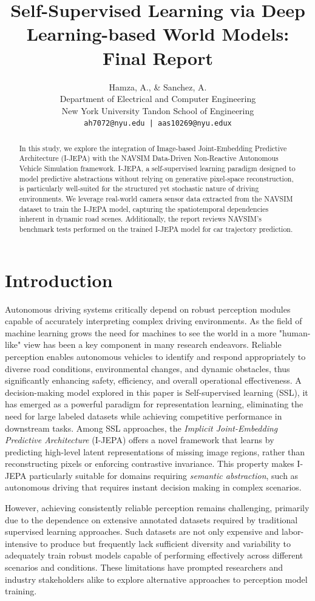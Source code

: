 \documentclass{article}
\title{Self-Supervised Learning via Deep Learning-based World Models: Final Report}
\author{
    Hamza, A., \& Sanchez, A. \\
    Department of Electrical and Computer Engineering \\
    New York University Tandon School of Engineering \\
    \texttt{ah7072@nyu.edu | aas10269@nyu.edux}
}
\begin{document}
\maketitle

\begin{abstract}
 In this study, we explore the integration of Image-based Joint-Embedding Predictive Architecture (I-JEPA) with the NAVSIM Data-Driven Non-Reactive Autonomous Vehicle Simulation framework. I-JEPA, a self-supervised learning paradigm designed to model predictive abstractions without relying on generative pixel-space reconstruction, is particularly well-suited for the structured yet stochastic nature of driving environments. We leverage real-world camera sensor data extracted from the NAVSIM dataset to train the I-JEPA model, capturing the spatiotemporal dependencies inherent in dynamic road scenes. Additionally, the report reviews NAVSIM's benchmark tests performed on the trained I-JEPA model for car trajectory prediction. 
\end{abstract}

\section{Introduction}
Autonomous driving systems critically depend on robust perception modules capable of accurately interpreting complex driving environments. As the field of machine learning grows the need for machines to see the world in a more "human-like" view has been a key component in many research endeavors. 
Reliable perception enables autonomous vehicles to identify and respond appropriately to diverse road conditions, environmental changes, and dynamic obstacles, thus significantly enhancing safety, efficiency, and overall operational effectiveness. A decision-making model explored in this paper is Self-supervised learning (SSL), it has emerged as a powerful paradigm for representation learning, eliminating the need for large labeled datasets while achieving competitive performance in downstream tasks. Among SSL approaches, the \textit{Implicit Joint-Embedding Predictive Architecture} (I-JEPA) offers a novel framework that learns by predicting high-level latent representations of missing image regions, rather than reconstructing pixels or enforcing contrastive invariance. This property makes I-JEPA particularly suitable for domains requiring \textit{semantic abstraction}, such as autonomous driving that requires instant decision making in complex scenarios.

However, achieving consistently reliable perception remains challenging, primarily due to the dependence on extensive annotated datasets required by traditional supervised learning approaches. Such datasets are not only expensive and labor-intensive to produce but frequently lack sufficient diversity and variability to adequately train robust models capable of performing effectively across different scenarios and conditions. These limitations have prompted researchers and industry stakeholders alike to explore alternative approaches to perception model training.
\end{document}
